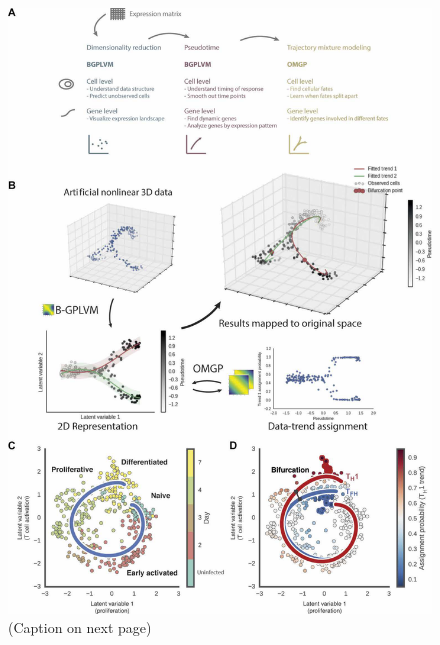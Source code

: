 \begin{figure}[!b]
    \centering
    \includegraphics[width=\textwidth]{"Fig2"}
    \caption[GPfates modeling of bifurcation processes using scRNA-seq data]{(Caption on next page)}
    \label{fig:models}
\end{figure}
\addtocounter{figure}{-1}
